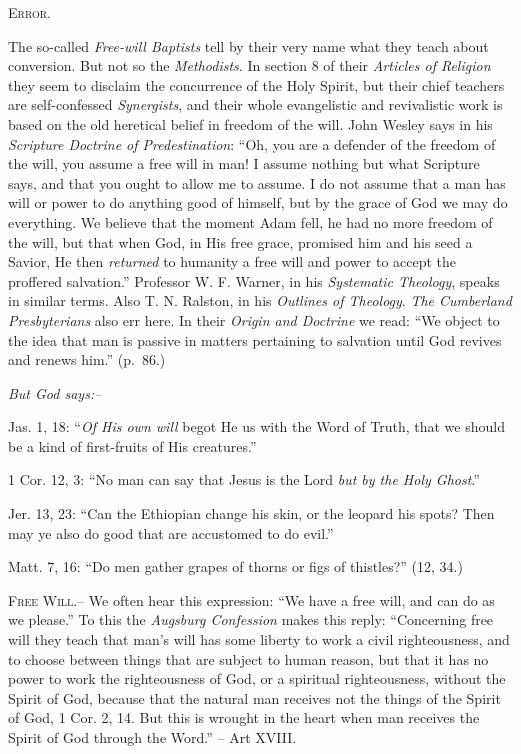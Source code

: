 \documentclass[
]{book}
\begin{document}
\begin{center}
\textsc{Error.}
\end{center}

The so-called \emph{Free-will Baptists} tell by their very name what they teach about conversion. But not so the \emph{Methodists}. In section 8 of their \emph{Articles of Religion} they seem to disclaim the concurrence of the Holy Spirit, but their chief teachers are self-confessed \emph{Synergists}, and their whole evangelistic and revivalistic work is based on the old heretical belief in freedom of the will. John Wesley says in his \emph{Scripture Doctrine of Predestination}: ``Oh, you are a defender of the freedom of the will, you assume a free will in man! I assume nothing but what Scripture says, and that you ought to allow me to assume. I do not assume that a man has will or power to do anything good of himself, but by the grace of God we may do everything. We believe that the moment Adam fell, he had no more freedom of the will, but that when God, in His free grace, promised him and his seed a Savior, He then \emph{returned} to humanity a free will and power to accept the proffered salvation.'' Professor W. F. Warner, in his \emph{Systematic Theology}, speaks in similar terms. Also T. N. Ralston, in his \emph{Outlines of Theology}. \emph{The Cumberland Presbyterians} also err here. In their \emph{Origin and Doctrine} we read: ``We object to the idea that man is passive in matters pertaining to salvation until God revives and renews him.'' (p.~86.)

\begin{center}
\textsl{But God says:--}
\end{center}

Jas. 1, 18: ``\emph{Of His own will} begot He us with the Word of Truth, that we should be a kind of first-fruits of His creatures.''

1 Cor. 12, 3: ``No man can say that Jesus is the Lord \emph{but by the Holy Ghost}.''

Jer. 13, 23: ``Can the Ethiopian change his skin, or the leopard his spots? Then may ye also do good that are accustomed to do evil.''

Matt. 7, 16: ``Do men gather grapes of thorns or figs of thistles?'' (12, 34.)

\textsc{Free Will.--} We often hear this expression: ``We have a free will, and can do as we please.'' To this the \emph{Augsburg Confession} makes this reply: ``Concerning free will they teach that man's will has some liberty to work a civil righteousness, and to choose between things that are subject to human reason, but that it has no power to work the righteousness of God, or a spiritual righteousness, without the Spirit of God, because that the natural man receives not the things of the Spirit of God, 1 Cor. 2, 14. But this is wrought in the heart when man receives the Spirit of God through the Word.'' -- Art XVIII.
\end{document}
